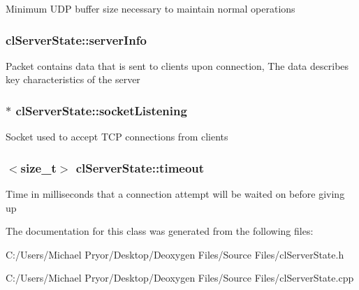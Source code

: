 \label{classcl_server_state_ae6d8460b8b124c1ece70b94440cea634}
Minimum UDP buffer size necessary to maintain normal operations \hypertarget{classcl_server_state_a65f672655a8b980a21e84d939ad81841}{
\subsubsection[{serverInfo}]{ {\bf clServerState::serverInfo}}}
\label{classcl_server_state_a65f672655a8b980a21e84d939ad81841}
Packet contains data that is sent to clients upon connection, The data describes key characteristics of the server \hypertarget{classcl_server_state_a5420d87b6c3e42c7ab033d00273ffe51}{
\subsubsection[{socketListening}]{$\ast$ {\bf clServerState::socketListening}}}
\label{classcl_server_state_a5420d87b6c3e42c7ab033d00273ffe51}
Socket used to accept TCP connections from clients \hypertarget{classcl_server_state_ad8a53992b7a622816eeb6b70fd4fec25}{
\subsubsection[{timeout}]{$<$size\_\-t$>$ {\bf clServerState::timeout}}}
\label{classcl_server_state_ad8a53992b7a622816eeb6b70fd4fec25}
Time in milliseconds that a connection attempt will be waited on before giving up 

The documentation for this class was generated from the following files:\begin{DoxyCompactItemize}
\item 
C:/Users/Michael Pryor/Desktop/Deoxygen Files/Source Files/clServerState.h\item 
C:/Users/Michael Pryor/Desktop/Deoxygen Files/Source Files/clServerState.cpp\end{DoxyCompactItemize}
